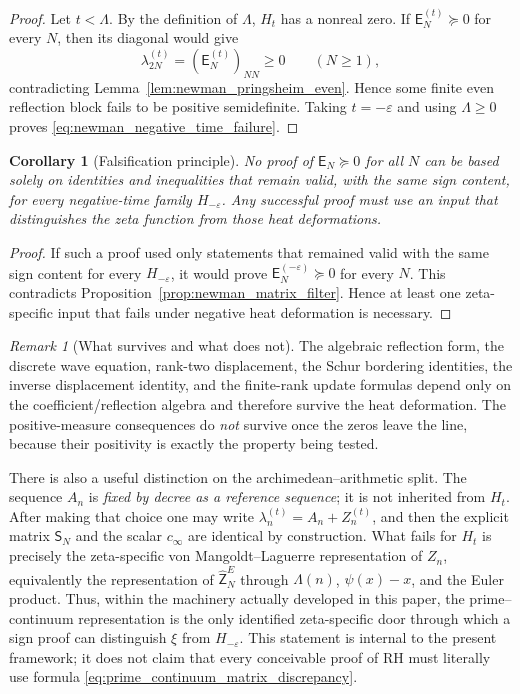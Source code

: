 \documentclass[11pt]{amsart}
\numberwithin{equation}{section}
\theoremstyle{plain}
\newtheorem{corollary}[theorem]{Corollary}
\theoremstyle{definition}
\theoremstyle{remark}
\newtheorem{remark}[theorem]{Remark}
\newcommand{\E}{\mathsf E}
\begin{document}
\begin{proof}
Let \(t<\Lambda\).  By the definition of \(\Lambda\), \(H_t\) has a nonreal zero.  If
\(\E_N^{(t)}\succeq0\) for every \(N\), then its diagonal would give
\[
\lambda_{2N}^{(t)}=(\E_N^{(t)})_{NN}\ge0
\qquad(N\ge1),
\]
contradicting Lemma~\ref{lem:newman_pringsheim_even}.  Hence some finite even reflection block
fails to be positive semidefinite.  Taking \(t=-\varepsilon\) and using \(\Lambda\ge0\) proves
\eqref{eq:newman_negative_time_failure}.
\end{proof}

\begin{corollary}[Falsification principle]
\label{cor:newman_falsification}
No proof of \(\E_N\succeq0\) for all \(N\) can be based solely on identities and inequalities that
remain valid, with the same sign content, for every negative-time family \(H_{-\varepsilon}\).
Any successful proof must use an input that distinguishes the zeta function from those heat
deformations.
\end{corollary}

\begin{proof}
If such a proof used only statements that remained valid with the same sign content for every
\(H_{-\varepsilon}\), it would prove \(\E_N^{(-\varepsilon)}\succeq0\) for every \(N\).
This contradicts Proposition~\ref{prop:newman_matrix_filter}.  Hence at least one
zeta-specific input that fails under negative heat deformation is necessary.
\end{proof}

\begin{remark}[What survives and what does not]
\label{rem:newman_survival}
The algebraic reflection form, the discrete wave equation, rank-two displacement, the Schur
bordering identities, the inverse displacement identity, and the finite-rank update formulas depend
only on the coefficient/reflection algebra and therefore survive the heat deformation.  The
positive-measure consequences do \emph{not} survive once the zeros leave the line, because their
positivity is exactly the property being tested.

There is also a useful distinction on the archimedean--arithmetic split.  The sequence \(A_n\) is
\emph{fixed by decree as a reference sequence}; it is not inherited from \(H_t\).  After making that
choice one may write
\(\lambda_n^{(t)}=A_n+Z_n^{(t)}\), and then the explicit matrix \(\mathsf S_N\) and the scalar
\(c_\infty\) are identical by construction.  What fails for \(H_t\) is precisely the zeta-specific
von Mangoldt--Laguerre representation of \(Z_n\), equivalently the representation of
\(\widehat{\mathsf Z}_N^E\) through \(\Lambda(n)\), \(\psi(x)-x\), and the Euler product.  Thus,
within the machinery actually developed in this paper, the prime--continuum representation is the
only identified zeta-specific door through which a sign proof can distinguish \(\xi\) from
\(H_{-\varepsilon}\).  This statement is internal to the present framework; it does not claim that
every conceivable proof of RH must literally use formula \eqref{eq:prime_continuum_matrix_discrepancy}.
\end{remark}
\end{document}
